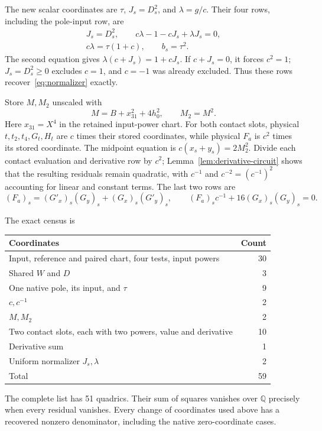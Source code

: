 \documentclass[11pt,a4paper]{article}
\newcommand{\Q}{\mathbb Q}\newcommand{\Z}{\mathbb Z}
\begin{document}
The new scalar coordinates are $\tau$, $J_s=D_s^2$, and
$\lambda=g/c$. Their four rows, including the pole-input row, are
\begin{equation}\label{eq:quadratic-gate}
\begin{gathered}
 J_s=D_s^2,\qquad c\lambda-1-cJ_s+\lambda J_s=0,\\
 c\lambda=\tau(1+c),\qquad b_s=\tau^2.
\end{gathered}
\end{equation}
The second equation gives
$\lambda(c+J_s)=1+cJ_s$. If $c+J_s=0$, it forces $c^2=1$;
$J_s=D_s^2\ge0$ excludes $c=1$, and $c=-1$ was already excluded.
Thus these rows recover~\eqref{eq:normalizer} exactly.

Store $M,M_2$ unscaled with
\[
 M=B+x_{31}^2+4h_0^2,\qquad M_2=M^2.
\]
Here $x_{31}=X^4$ in the retained input-power chart. For both contact
slots, physical $t,t_2,t_4,G_t,H_t$ are $c$ times their stored
coordinates, while physical $F_a$ is $c^2$ times its stored coordinate.
The midpoint equation is $c(x_s+y_s)=2M_2^2$.
Divide each contact evaluation and derivative row by $c^2$;
Lemma~\ref{lem:derivative-circuit} shows that the resulting residuals
remain quadratic, with $c^{-1}$ and $c^{-2}=(c^{-1})^2$ accounting for
linear and constant terms. The last two rows are
\[
 (F_a)_s=(G'_x)_s(G_y)_s+(G_x)_s(G'_y)_s,
 \qquad (F_a)_sc^{-1}+16(G_x)_s(G_y)_s=0.
\]

\begin{samepage}
The exact census is
\begin{center}
\begin{tabular}{lr}
\toprule
Coordinates&Count\\\midrule
Input, reference and paired chart, four tests, input powers&30\\
Shared $W$ and $D$&3\\
One native pole, its input, and $\tau$&9\\
$c,c^{-1}$&2\\
$M,M_2$&2\\
Two contact slots, each with two powers, value and derivative&10\\
Derivative sum&1\\
Uniform normalizer $J_s,\lambda$&2\\\midrule
Total&59\\\bottomrule
\end{tabular}
\end{center}
\end{samepage}
The complete list has 51 quadrics. Their sum of squares vanishes over
$\Q$ precisely when every residual vanishes. Every change of coordinates
used above has a recovered nonzero denominator, including the native
zero-coordinate cases.
\end{document}

